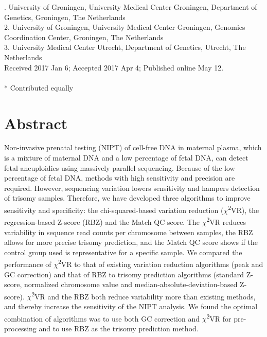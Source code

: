 . University of Groningen, University Medical Center Groningen, Department of Genetics, Groningen, The Netherlands\\
2. University of Groningen, University Medical Center Groningen, Genomics Coordination Center, Groningen, The Netherlands\\
3. University Medical Center Utrecht, Department of Genetics, Utrecht, The Netherlands\\


\noindent
Received 2017 Jan 6; Accepted 2017 Apr 4; Published online May 12.
\\~\\
* Contributed equally



\section*{Abstract}\label{abstract}
Non-invasive prenatal testing (NIPT) of cell-free DNA in maternal plasma, which is a mixture of maternal DNA and a low percentage of fetal DNA, can detect fetal aneuploidies using massively parallel sequencing. 
Because of the low percentage of fetal DNA, methods with high sensitivity and precision are required. 
However, sequencing variation lowers sensitivity and hampers detection of trisomy samples. 
Therefore, we have developed three algorithms to improve sensitivity and specificity: the chi-squared-based variation reduction ($\chi$\textsuperscript{2}VR), the regression-based Z-score (RBZ) and the Match QC score. 
The $\chi$\textsuperscript{2}VR reduces variability in sequence read counts per chromosome between samples, the RBZ allows for more precise trisomy prediction, and the Match QC score shows if the control group used is representative for a specific sample. We compared the performance of $\chi$\textsuperscript{2}VR to that of existing variation reduction algorithms (peak and GC correction) and that of RBZ to trisomy prediction algorithms (standard Z-score, normalized chromosome value and median-absolute-deviation-based Z-score). 
$\chi$\textsuperscript{2}VR and the RBZ both reduce variability more than existing methods, and thereby increase the sensitivity of the NIPT analysis. 
We found the optimal combination of algorithms was to use both GC correction and $\chi$\textsuperscript{2}VR for pre-processing and to use RBZ as the trisomy prediction method.

